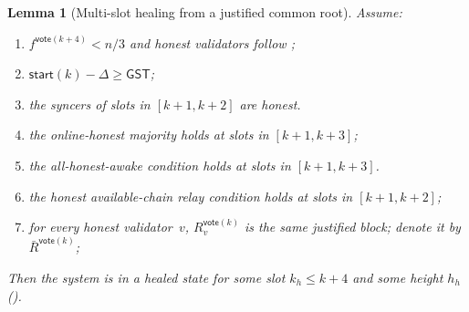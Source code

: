 \documentclass{article}
\newcommand{\start}{\mathsf{start}}
\newcommand{\vote}{\mathsf{vote}}
\newcommand{\comm}[1]{\bar{#1}}
\newcommand{\getConfirmed}{\textsf{getConfirmed}\xspace}
\theoremstyle{plain}
\newtheorem{lemma}{Lemma}
\theoremstyle{definition}
\theoremstyle{remark}
\newcommand{\GST}{\ensuremath{\mathsf{GST}}}
\newcommand{\OHM}{online-honest majority\xspace}
\newcommand{\HAR}{honest available-chain relay\xspace}
\newcommand{\AHA}{all-honest-awake\xspace}
\begin{document}
\begin{lemma}[Multi-slot healing from a justified common root]\label{rev:lem:healing-from-justified-multi}
Assume:
\begin{enumerate}
  \item\label{rev:hfjm:f} $f^{\vote(k+4)} < n/3$ and honest validators follow ;
  \item\label{rev:hfjm:sync} $\start(k) - \Delta \geq \GST$;
  \item\label{rev:hfjm:syncers} the syncers of slots in $[k+1, k+2]$ are honest.
  \item\label{rev:hfjm:ohm} the \OHM holds at slots in $[k+1, k+3]$;
  \item\label{rev:hfjm:aha} the \AHA condition holds at slots in $[k+1, k+3]$.
  \item\label{rev:hfjm:har} the \HAR condition holds at slots in $[k+1, k+2]$;
  \item\label{rev:hfjm:r} for every honest validator~$v$, $R_v^{\vote(k)}$ is the same justified block; denote it by $\comm{R}^{\vote(k)}$;
\end{enumerate}
Then the system is in a healed state for some slot $k_h \leq k+4$ and some height $h_h$ ().
\end{lemma}
\end{document}
